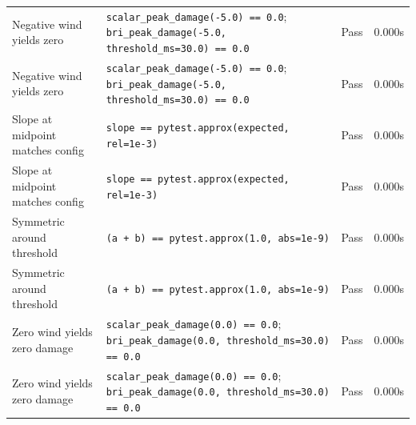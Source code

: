 \documentclass[11pt,a4paper]{article}
\begin{document}
\begin{longtable}{p{6cm}p{5.5cm}cc}
    Negative wind yields zero & {\scriptsize \texttt{scalar\_peak\_damage(-5.0) == 0.0}; \texttt{bri\_peak\_damage(-5.0, threshold\_ms=30.0) == 0.0}} & \textcolor{green!60!black}{Pass} & 0.000s \\
    Negative wind yields zero & {\scriptsize \texttt{scalar\_peak\_damage(-5.0) == 0.0}; \texttt{bri\_peak\_damage(-5.0, threshold\_ms=30.0) == 0.0}} & \textcolor{green!60!black}{Pass} & 0.000s \\
    Slope at midpoint matches config & {\scriptsize \texttt{slope == pytest.approx(expected, rel=1e-3)}} & \textcolor{green!60!black}{Pass} & 0.000s \\
    Slope at midpoint matches config & {\scriptsize \texttt{slope == pytest.approx(expected, rel=1e-3)}} & \textcolor{green!60!black}{Pass} & 0.000s \\
    Symmetric around threshold & {\scriptsize \texttt{(a + b) == pytest.approx(1.0, abs=1e-9)}} & \textcolor{green!60!black}{Pass} & 0.000s \\
    Symmetric around threshold & {\scriptsize \texttt{(a + b) == pytest.approx(1.0, abs=1e-9)}} & \textcolor{green!60!black}{Pass} & 0.000s \\
    Zero wind yields zero damage & {\scriptsize \texttt{scalar\_peak\_damage(0.0) == 0.0}; \texttt{bri\_peak\_damage(0.0, threshold\_ms=30.0) == 0.0}} & \textcolor{green!60!black}{Pass} & 0.000s \\
    Zero wind yields zero damage & {\scriptsize \texttt{scalar\_peak\_damage(0.0) == 0.0}; \texttt{bri\_peak\_damage(0.0, threshold\_ms=30.0) == 0.0}} & \textcolor{green!60!black}{Pass} & 0.000s \\
\end{longtable}

\clearpage
\end{document}
